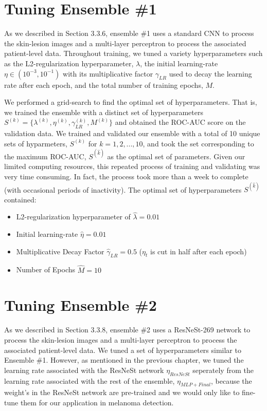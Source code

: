 \documentclass [MAS] {uclathes}
\begin{document}
\section{Tuning Ensemble \#1}

As we described in Section 3.3.6, ensemble \#1 uses a standard CNN to process the skin-lesion images and a multi-layer perceptron to process the associated patient-level data. Throughout training, we tuned a variety hyperparameters such as the L2-regularization hyperparameter, $\lambda$, the initial learning-rate $\eta\in (10^{-3}, 10^{-1})$ with its multiplicative factor $\gamma_{LR}$ used to decay the learning rate after each epoch, and the total number of training epochs, $M$.

We performed a grid-search to find the optimal set of hyperparameters. That is, we trained the ensemble with a distinct set of hyperparameters $S^{(k)} = \{\lambda^{(k)}, \eta^{(k)}, \gamma_{LR}^{(k)}, M^{(k)}\}$ and obtained the ROC-AUC score on the validation data. We trained and validated our ensemble with a total of 10 unique sets of hyparmeters, $S^{(k)}$ for $k=1, 2, ..., 10$, and took the set corresponding to the maximum ROC-AUC, $S^{(\hat k)}$ as the optimal set of parameters. Given our limited computing resources, this repeated process of training and validating was very time consuming. In fact, the process took more than a week to complete (with occasional periods of inactivity). The optimal set of hyperparameters $S^{(\hat k)}$ contained:

\begin{itemize}
    \item L2-regularization hyperparameter of $\hat \lambda = 0.01$
    \item Initial learning-rate $\hat \eta = 0.01$
    \item Multiplicative Decay Factor $\hat \gamma_{LR} = 0.5$ ($\eta_{t}$ is cut in half after each epoch)
    \item Number of Epochs $\hat M=10$
\end{itemize}


\section{Tuning Ensemble \#2}

As we described in Section 3.3.8, ensemble \#2 uses a ResNeSt-269 network to process the skin-lesion images and a multi-layer perceptron to process the associated patient-level data. We tuned a set of hyperparameters similar to Ensemble \#1. However, as mentioned in the previous chapter, we tuned the learning rate associated with the ResNeSt network $\eta_{ResNeSt}$ seperately from the learning rate associated with the rest of the ensemble, $\eta_{MLP + Final}$, because the weight's in the ResNeSt network are pre-trained and we would only like to fine-tune them for our application in melanoma detection.
\end{document}
